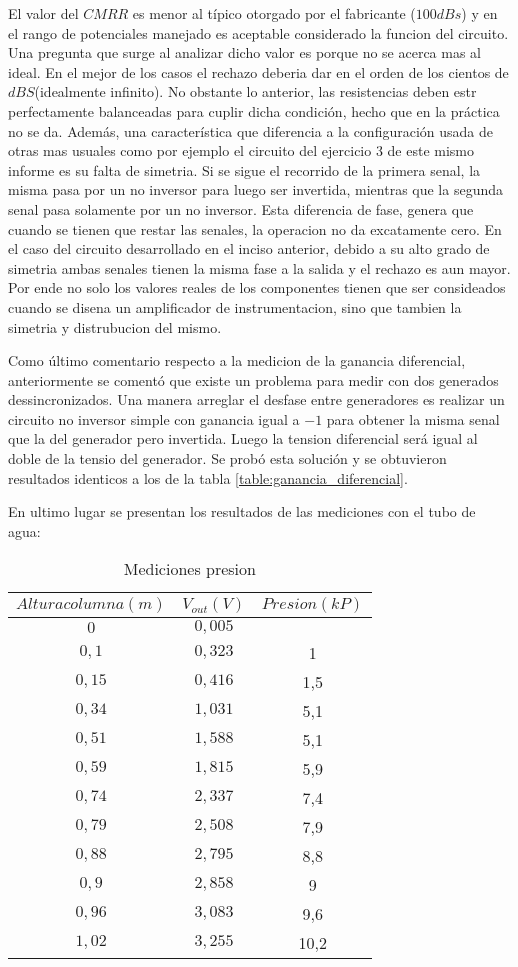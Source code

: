 El valor del $CMRR$ es menor al t\'ipico otorgado por el fabricante ($100dBs$) y en el rango de potenciales manejado es aceptable considerado la funcion del circuito. Una pregunta que surge al analizar dicho valor es porque no se acerca mas al ideal. En el mejor de los casos el rechazo deberia dar en el orden de los cientos de $dBS$(idealmente infinito). No obstante lo anterior, las resistencias deben estr perfectamente balanceadas para cuplir dicha condici\'on, hecho que en la pr\'actica no se da. Adem\'as, una caracter\'istica que diferencia a la configuraci\'on usada de otras mas usuales como por ejemplo el circuito del ejercicio 3 de este mismo informe es su falta de simetria. Si se sigue el recorrido de la primera senal, la misma pasa por un no inversor para luego ser invertida, mientras que la segunda senal pasa solamente por un no inversor. Esta diferencia de fase, genera que cuando se tienen que restar las senales, la operacion no da excatamente cero. En el caso del circuito desarrollado en el inciso anterior, debido a su alto grado de simetria ambas senales tienen la misma fase a la salida y el rechazo es aun mayor. Por ende no solo los valores reales de los componentes tienen que ser consideados cuando se disena un amplificador de instrumentacion, sino que tambien la simetria y distrubucion del mismo. 


Como último comentario respecto a la medicion de la ganancia diferencial, anteriormente se comentó que existe un problema para medir con dos generados dessincronizados. Una manera arreglar el desfase entre generadores es realizar un circuito no inversor simple con ganancia igual a $-1$ para obtener la misma senal que la del generador pero invertida. Luego la tension diferencial ser\'a igual al doble de la tensio del generador. Se prob\'o esta soluci\'on y se obtuvieron resultados identicos a los de la tabla \ref{table:ganancia_diferencial}.

En ultimo lugar se presentan los resultados de las mediciones con el tubo de agua:

\begin{table}[H]
\centering
\begin{tabular}{ccc}\hline
$Altura columna(m)$ & $V_{out}(V)$ & $Presion(kP)$ \\
\hline
$0$   & $0,005$ &   \\
$0,1$  & $0,323$ & 1 \\
$0,15$  & $0,416$ & 1,5 \\
$0,34$  & $1,031$ & 5,1 \\
$0,51$  & $1,588$ & 5,1\\
$0,59$  & $1,815$ & 5,9\\
$0,74$  & $2,337$ & 7,4\\
$0,79$  & $2,508$ & 7,9\\
$0,88$  & $2,795$ & 8,8\\
$0,9$  & $2,858$ & 9\\
$0,96$  & $3,083$ & 9,6\\
$1,02$  & $3,255$ & 10,2\\ \hline
\end{tabular}
\caption{Mediciones presion}
\label{table:presion}
\end{table}

